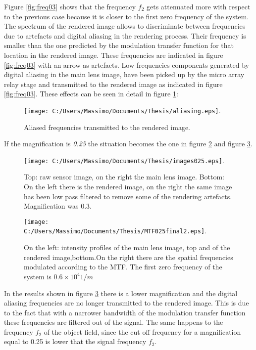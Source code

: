  Figure \ref{fig:freq03} shows that the frequency $f_2$ gets attenuated more with respect to the previous case because it is closer to the first zero frequency of the system. The spectrum of the rendered image allows to discriminate between frequencies due to artefacts and digital aliasing in the rendering process. Their frequency is smaller than the one predicted by the modulation transfer function for that location in the rendered image. These frequencies are indicated in figure \ref{fig:freq03} with an arrow as artefacts. Low frequencies components generated by digital aliasing in the main lens image, have been picked up by the micro array relay stage and transmitted to the rendered image as indicated in figure \ref{fig:freq03}. These effects can be seen in detail in figure \ref{fig:aliasing}:
 \begin{figure}[H]
 	\centering
 	\texttt{[image: C:/Users/Massimo/Documents/Thesis/aliasing.eps]}.
 	\caption{\label{fig:aliasing} Aliased frequencies transmitted to the rendered image. }
 \end{figure}
If the magnification is \textit{0.25} the situation becomes the one in figure \ref{fig:image025} and figure \ref{fig:freq025}.
 \begin{figure}[H]
 	\centering
 	\texttt{[image: C:/Users/Massimo/Documents/Thesis/images025.eps]}.
 	\caption{\label{fig:image025} Top: raw sensor image, on the right the main lens image. Bottom: On the left there is the  rendered image, on the right the same image has been low pass filtered to remove some of the rendering artefacts. Magnification was 0.3.  }
 \end{figure}
 \begin{figure}[H]
 	\centering
 	\texttt{[image: C:/Users/Massimo/Documents/Thesis/MTF025final2.eps]}.
 	\caption{\label{fig:freq025} On the left: intensity profiles of the main lens image, top and of the rendered image,bottom.On the right there are the spatial frequencies modulated according to the MTF. The first zero frequency of the system is $0.6 \times 10^4 1/m$} 
 \end{figure}
 In the results shown in figure \ref{fig:freq025} there is a lower magnification and the digital aliasing frequencies are no longer transmitted to the rendered image. This is due to the fact that with a narrower  bandwidth of the modulation transfer function these frequencies are filtered out of the signal. The same happens to the frequency $f_2$ of the object field, since the cut off frequency for a magnification equal to 0.25 is lower that the signal frequency $f_2$.
